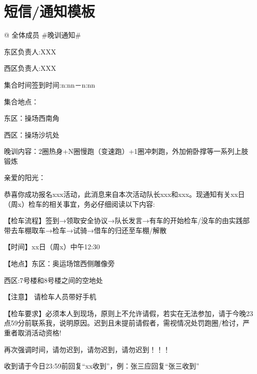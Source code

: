 \documentclass{ctexbook}
\begin{document}
\section{短信/通知模板}
\label{ssec:晚训通知}
\begin{center}
    \begin{tcolorbox}[title=晚训通知,text width = 0.8\linewidth]
        @ 全体成员 \#晚训通知\#
    
        东区负责人:XXX
        
        西区负责人:XXX
        
        集合时间签到时间:n:nn－n:nn
        
        集合地点：
        
        东区：操场西南角
        
        西区：操场沙坑处
        
        晚训内容：2圈热身+N圈慢跑（变速跑）+1圈冲刺跑，外加俯卧撑等一系列上肢锻炼
    
        \end{tcolorbox}
    \end{center}

\label{subsec:检车通知}
\begin{center}

    \begin{tcolorbox}[title=检车通知,text width = 0.8\linewidth]
        
    亲爱的阳光： 
    
        恭喜你成功报名xxx活动，此消息来自本次活动队长xxx和xxx。现通知有关xx日（周x）检车的相关事宜，务必仔细阅读以下内容:
              
        【检车流程】签到→领取安全协议→队长发言→有车的开始检车/没车的由实践部带去车棚取车→检车→试骑→借车的归还至车棚/解散
              
        【时间】xx日（周x）中午12:30
              
        【地点】东区：奥运场馆西侧雕像旁\par 西区:7号楼和8号楼之间的空地处
              
        【注意】 请检车人员带好手机
              
        【检车要求】必须本人到现场，原则上不允许请假，若实在无法参加，请于今晚23点59分前联系我，说明原因。迟到且未提前请假者，需视情况处罚跑圈/检讨，严重者取消活动资格!
              
        再次强调时间，请勿迟到，请勿迟到，请勿迟到！！！
              
        收到请于今日23:59前回复``xx收到''，例：张三应回复``张三收到''
    \end{tcolorbox}
    \end{center}
\end{document}
